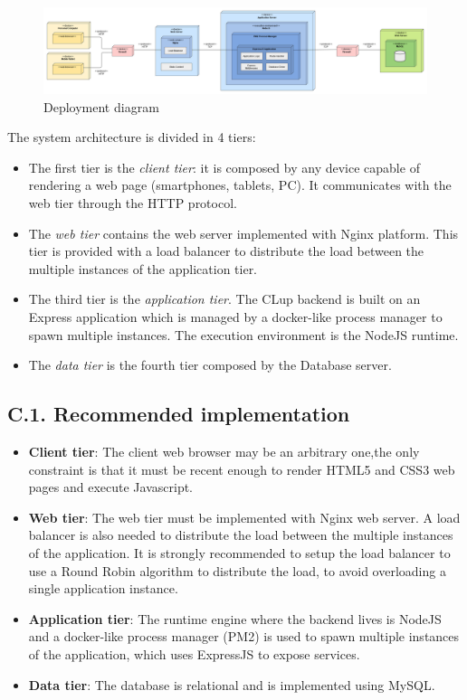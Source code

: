 \begin{figure}[H]
\centering
\includegraphics{assets/dd/deployment_view/deployment_diagram}
\caption{Deployment diagram}
\end{figure}

The system architecture is divided in 4 tiers:
\begin{itemize}
\item
    The first tier is the \emph{client tier}: it is composed by any device capable of rendering a web page (smartphones, tablets, PC). It communicates with the web tier through the HTTP protocol.
\item
    The \emph{web tier} contains the web server implemented with Nginx platform. This tier is provided with a load balancer to distribute the load between the multiple instances of the application tier.
\item
    The third tier is the \emph{application tier}. The CLup backend is built on an Express application which is managed by a docker-like process manager to spawn multiple instances. The execution environment is the NodeJS runtime.
\item
    The \emph{data tier} is the fourth tier composed by the Database server.
\end{itemize}

\subsection{C.1. Recommended implementation}

\begin{itemize}
\item
    \textbf{Client tier}: The client web browser may be an arbitrary one,the only constraint is that it must be recent enough to render HTML5 and CSS3 web pages and execute Javascript.
\item
    \textbf{Web tier}: The web tier must be implemented with Nginx web server. A load balancer is also needed to distribute the load between the multiple instances of the application. It is strongly recommended to setup the load balancer to use a Round Robin algorithm to distribute the load, to avoid overloading a single application instance.
\item
    \textbf{Application tier}: The runtime engine where the backend lives is NodeJS and a docker-like process manager (PM2) is used to spawn multiple instances of the application, which uses ExpressJS to expose services.
\item
    \textbf{Data tier}: The database is relational and is implemented using MySQL.
\end{itemize}

